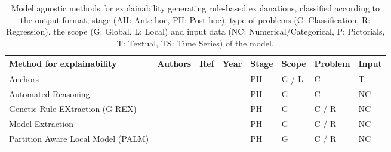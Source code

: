 \documentclass[final,1p,times]{elsarticle}
\begin{document}
\begin{table}[h!]
\footnotesize
    \caption{Model agnostic methods for explainability generating rule-based explanations, classified according to the output format, stage (AH: Ante-hoc, PH: Post-hoc), type of problems (C: Classification, R: Regression), the scope (G: Global, L: Local) and input data (NC: Numerical/Categorical, P: Pictorials, T: Textual, TS: Time Series) of the  model.}
    \label{tab:model-agnostic-rule}
    \begin{tabular}{m{4.3cm} m{2.1cm} m{0.5cm} m{0.7cm} m{0.5cm} m{0.6cm} m{0.8cm} m{0.6cm}}
    \hline
    Method for explainability & Authors & Ref & Year & Stage & Scope & Problem & Input\\
    \hline
    Anchors & \citeauthor{ribeiro2018anchors} & \cite{ribeiro2018anchors} & \citeyear{ribeiro2018anchors} & PH & G / L & C & T\\
    Automated Reasoning & \citeauthor{bride2018towards} & \cite{bride2018towards} & \citeyear{bride2018towards} & PH & G & C & NC\\
    Genetic Rule EXtraction (G-REX) & \citeauthor{johansson2004accuracy} & \cite{johansson2004accuracy,johansson2004truth} & \citeyear{johansson2004accuracy} & PH & G & C / R & NC\\
    Model Extraction &  \citeauthor{bastani2017interpretability} &  \cite{bastani2017interpretability} &  \citeyear{bastani2017interpretability} & PH & G & C / R & NC\\
    Partition Aware Local Model (PALM) &  \citeauthor{krishnan2017palm} &  \cite{krishnan2017palm} &  \citeyear{krishnan2017palm} & PH & G & C / R & NC\\
    \hline
\end{tabular}
\end{table}
\end{document}
